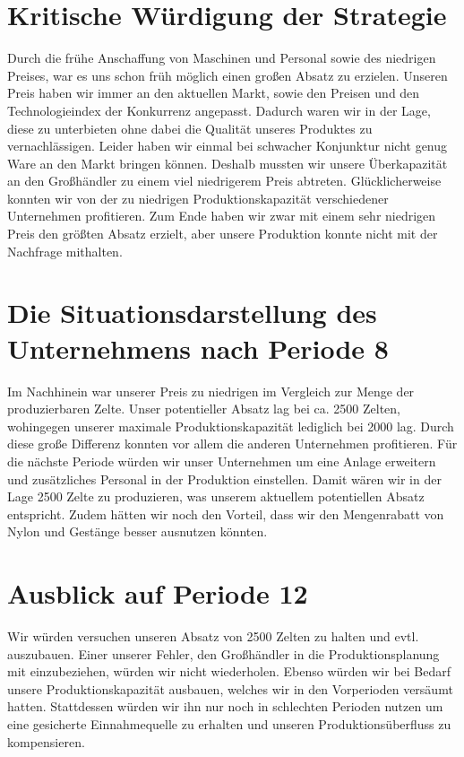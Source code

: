 \documentclass[a4paper, 12pt]{report}
\begin{document}
\begin{flushleft}
\chapter{Kritische Würdigung der Strategie}
Durch die frühe Anschaffung von Maschinen und Personal sowie des niedrigen Preises, war es uns schon früh möglich einen großen Absatz zu erzielen.
Unseren Preis haben wir immer an den aktuellen Markt, sowie den Preisen und den Technologieindex der Konkurrenz angepasst.
Dadurch waren wir in der Lage, diese zu unterbieten ohne dabei die Qualität unseres Produktes zu vernachlässigen.
Leider haben wir einmal bei schwacher Konjunktur nicht genug Ware an den Markt bringen können.
Deshalb mussten wir unsere Überkapazität an den Großhändler zu einem viel niedrigerem Preis abtreten.
Glücklicherweise konnten wir von der zu niedrigen Produktionskapazität verschiedener Unternehmen profitieren.
Zum Ende haben wir zwar mit einem sehr niedrigen Preis den größten Absatz erzielt, aber unsere Produktion konnte nicht mit der Nachfrage mithalten.

\chapter{Die Situationsdarstellung des Unternehmens nach Periode 8}  
Im Nachhinein war unserer Preis zu niedrigen im Vergleich zur Menge der produzierbaren Zelte.
Unser potentieller Absatz lag bei ca. 2500 Zelten, wohingegen unserer maximale Produktionskapazität lediglich bei 2000 lag.
Durch diese große Differenz konnten vor allem die anderen Unternehmen profitieren.
Für die nächste Periode würden wir unser Unternehmen um eine Anlage erweitern und zusätzliches Personal in der Produktion einstellen.
Damit wären wir in der Lage 2500 Zelte zu produzieren, was unserem aktuellem potentiellen Absatz entspricht.
Zudem hätten wir noch den Vorteil, dass wir den Mengenrabatt von Nylon und Gestänge besser ausnutzen könnten.

\chapter{Ausblick auf Periode 12}
Wir würden versuchen unseren Absatz von 2500 Zelten zu halten und evtl. auszubauen.
Einer unserer Fehler, den Großhändler in die Produktionsplanung mit einzubeziehen, würden wir nicht wiederholen.
Ebenso würden wir bei Bedarf unsere Produktionskapazität ausbauen, welches wir in den Vorperioden versäumt hatten.
Stattdessen würden wir ihn nur noch in schlechten Perioden nutzen um eine gesicherte Einnahmequelle zu erhalten und unseren Produktionsüberfluss zu kompensieren.



\end{flushleft}
\end{document}
